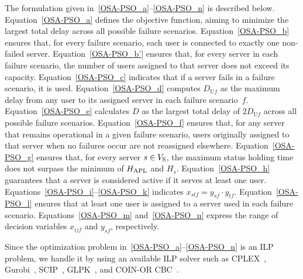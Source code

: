 \documentclass[10pt, letterpaper]{IEEEtran}
\newcommand\magenta[1]{\textcolor{magenta}{#1}}
\begin{document}
\begin{CJK}{UTF8}{ipxm}
The formulation given in~\eqref{OSA-PSO_a}--\eqref{OSA-PSO_n} is described below.
Equation~\eqref{OSA-PSO_a} defines the objective function, aiming to minimize the largest total delay across all possible failure scenarios.
Equation~\eqref{OSA-PSO_b} ensures that, for every failure scenario, each user is connected to exactly one non-failed server.
Equation~\eqref{OSA-PSO_b'} ensures that, for every server in each failure scenario, the number of users assigned to that server does not exceed its capacity.
Equation~\eqref{OSA-PSO_c} indicates that if a server fails in a failure scenario, it is used.
%
Equation~\eqref{OSA-PSO_d} computes $D_{\mathrm{U}f}$ as the maximum delay from any user to its assigned server in each failure scenario~$f$. %
Equation~\eqref{OSA-PSO_e} calculates $D$ as the largest total delay of $2D_{\mathrm{U}f}$ across all possible failure scenarios.
Equation~\eqref{OSA-PSO_f} ensures that, for any server that remains operational in a given failure scenario, users originally assigned to that server when no failures occur are not reassigned elsewhere.
Equation~\eqref{OSA-PSO_g} ensures that, for every server $s \in V_{\rm{S}}$, the maximum status holding time does not surpass the minimum of $H_{\rm APL}$ and $H_s$.
Equation~\eqref{OSA-PSO_h} guarantees that a server is considered active if it serves at least one user.
Equations~\eqref{OSA-PSO_i}--\eqref{OSA-PSO_k} indicates $x_{stf} = y_{sf} \cdot y_{tf}$.
Equation~\eqref{OSA-PSO_l} ensures that at least one user is assigned to a server used in each failure scenario. Equations~\eqref{OSA-PSO_m} and~\eqref{OSA-PSO_n} express the range of decision variables $x_{ijf}$ and $y_{sf}$, respectively.

Since the optimization problem in~\eqref{OSA-PSO_a}--\eqref{OSA-PSO_n} is an ILP problem, we handle it by using an available ILP solver such as CPLEX~\cite{CPLEX}, Gurobi~\cite{Gurobi}, SCIP~\cite{SCIP}, GLPK~\cite{GLPK}, and COIN-OR CBC~\cite{CBC}.


\end{CJK}
\end{document}
